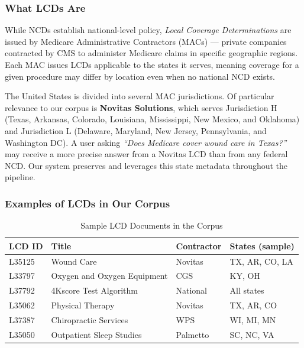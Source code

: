 \documentclass[12pt, letterpaper]{article}
\begin{document}
\subsubsection{What LCDs Are}

While NCDs establish national-level policy, \textit{Local Coverage Determinations} are
issued by Medicare Administrative Contractors (MACs) --- private companies contracted
by CMS to administer Medicare claims in specific geographic regions. Each MAC issues
LCDs applicable to the states it serves, meaning coverage for a given procedure may
differ by location even when no national NCD exists.

The United States is divided into several MAC jurisdictions. Of particular relevance to
our corpus is \textbf{Novitas Solutions}, which serves Jurisdiction H (Texas, Arkansas,
Colorado, Louisiana, Mississippi, New Mexico, and Oklahoma) and Jurisdiction L
(Delaware, Maryland, New Jersey, Pennsylvania, and Washington DC). A user asking
\textit{``Does Medicare cover wound care in Texas?''} may receive a more precise answer
from a Novitas LCD than from any federal NCD. Our system preserves and leverages this
state metadata throughout the pipeline.

\subsubsection{Examples of LCDs in Our Corpus}

\begin{table}[h]
\centering
\caption{Sample LCD Documents in the Corpus}
\label{tab:lcdsample}
\begin{tabular}{@{}llll@{}}
\toprule
\textbf{LCD ID} & \textbf{Title} & \textbf{Contractor} & \textbf{States (sample)} \\
\midrule
L35125 & Wound Care                  & Novitas  & TX, AR, CO, LA \\
L33797 & Oxygen and Oxygen Equipment & CGS      & KY, OH \\
L37792 & 4Kscore Test Algorithm      & National & All states \\
L35062 & Physical Therapy            & Novitas  & TX, AR, CO \\
L37387 & Chiropractic Services       & WPS      & WI, MI, MN \\
L35050 & Outpatient Sleep Studies    & Palmetto & SC, NC, VA \\
\bottomrule
\end{tabular}
\end{table}
\end{document}
